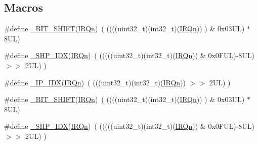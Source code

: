 \subsection*{Macros}
\begin{DoxyCompactItemize}
\item 
\#define \hyperlink{group___c_m_s_i_s___core___n_v_i_c_functions_ga53c75b28823441c6153269f0ecbed878}{\+\_\+\+B\+I\+T\+\_\+\+S\+H\+I\+FT}(\hyperlink{group___configuration__section__for___c_m_s_i_s_ga666eb0caeb12ec0e281415592ae89083}{I\+R\+Qn})~(  ((((uint32\+\_\+t)(int32\+\_\+t)(\hyperlink{group___configuration__section__for___c_m_s_i_s_ga666eb0caeb12ec0e281415592ae89083}{I\+R\+Qn}))         )      \&  0x03\+U\+L) $\ast$ 8\+U\+L)
\item 
\#define \hyperlink{group___c_m_s_i_s___core___n_v_i_c_functions_gaee4f7eb5d7e770ad51489dbceabb1755}{\+\_\+\+S\+H\+P\+\_\+\+I\+DX}(\hyperlink{group___configuration__section__for___c_m_s_i_s_ga666eb0caeb12ec0e281415592ae89083}{I\+R\+Qn})~( (((((uint32\+\_\+t)(int32\+\_\+t)(\hyperlink{group___configuration__section__for___c_m_s_i_s_ga666eb0caeb12ec0e281415592ae89083}{I\+R\+Qn})) \& 0x0\+F\+U\+L)-\/8\+U\+L) $>$$>$    2\+U\+L)      )
\item 
\#define \hyperlink{group___c_m_s_i_s___core___n_v_i_c_functions_ga370ec4b1751a6a889d849747df3763a9}{\+\_\+\+I\+P\+\_\+\+I\+DX}(\hyperlink{group___configuration__section__for___c_m_s_i_s_ga666eb0caeb12ec0e281415592ae89083}{I\+R\+Qn})~(   (((uint32\+\_\+t)(int32\+\_\+t)(\hyperlink{group___configuration__section__for___c_m_s_i_s_ga666eb0caeb12ec0e281415592ae89083}{I\+R\+Qn}))                $>$$>$    2\+U\+L)      )
\item 
\#define \hyperlink{group___c_m_s_i_s___core___n_v_i_c_functions_ga53c75b28823441c6153269f0ecbed878}{\+\_\+\+B\+I\+T\+\_\+\+S\+H\+I\+FT}(\hyperlink{group___configuration__section__for___c_m_s_i_s_ga666eb0caeb12ec0e281415592ae89083}{I\+R\+Qn})~(  ((((uint32\+\_\+t)(int32\+\_\+t)(\hyperlink{group___configuration__section__for___c_m_s_i_s_ga666eb0caeb12ec0e281415592ae89083}{I\+R\+Qn}))         )      \&  0x03\+U\+L) $\ast$ 8\+U\+L)
\item 
\#define \hyperlink{group___c_m_s_i_s___core___n_v_i_c_functions_gaee4f7eb5d7e770ad51489dbceabb1755}{\+\_\+\+S\+H\+P\+\_\+\+I\+DX}(\hyperlink{group___configuration__section__for___c_m_s_i_s_ga666eb0caeb12ec0e281415592ae89083}{I\+R\+Qn})~( (((((uint32\+\_\+t)(int32\+\_\+t)(\hyperlink{group___configuration__section__for___c_m_s_i_s_ga666eb0caeb12ec0e281415592ae89083}{I\+R\+Qn})) \& 0x0\+F\+U\+L)-\/8\+U\+L) $>$$>$    2\+U\+L)      )
$$
\end{DoxyCompactItemize}
